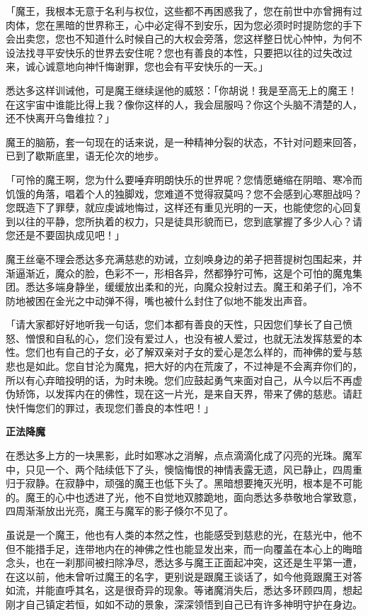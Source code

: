 \documentclass[twoside,openany]{book}
\newcommand{\mt}[1]{\textbullet \textbf{#1}}
\begin{document}
「魔王，我根本无意于名利与权位，这些都不再困惑我了，您在前世中亦曾拥有过肉体，您在黑暗的世界称王，心中必定得不到安乐，因为您必须时时提防您的手下会出卖您，您也不知道什么时候自己的大权会旁落，您这样整日忧心忡忡，为何不设法找寻平安快乐的世界去安住呢？您也有善良的本性，只要把以往的过失改过来，诚心诚意地向神忏悔谢罪，您也会有平安快乐的一天。」

悉达多这样训诫他，可是魔王继续逞他的威怒：「你胡说！我是至高无上的魔王！在这宇宙中谁能比得上我？像你这样的人，我会屈服吗？你这个头脑不清楚的人，还不快离开乌鲁维拉？」

魔王的脑筋，套一句现在的话来说，是一种精神分裂的状态，不针对问题来回答，已到了歇斯底里，语无伦次的地步。

「可怜的魔王啊，您为什么要唾弃明朗快乐的世界呢？您情愿蜷缩在阴暗、寒冷而饥饿的角落，唱着个人的独脚戏，您难道不觉得寂莫吗？您不会感到心寒胆战吗？您既造下了罪孽，就应虔诚地悔过，这样还有重见光明的一天，也能使您的心回复到以往的平静，您所执着的权力，只是徒具形貌而已，您到底掌握了多少人心？请您还是不要固执成见吧！」

魔王丝毫不理会悉达多充满慈悲的劝诫，立刻唤身边的弟子把菩提树包围起来，并渐逼渐近，魔众的脸，色彩不一，形相各异，然都狰狞可怖，这是个可怕的魔鬼集团。悉达多端身静坐，缓缓放出柔和的光，向魔众投射过去。魔王和弟子们，冷不防地被困在金光之中动弹不得，嘴也被什么封住了似地不能发出声音。

「请大家都好好地听我一句话，您们本都有善良的天性，只因您们孳长了自己愤怒、憎恨和自私的心，您们没有爱过人，也没有被人爱过，也就无法发挥慈爱的本性。您们也有自己的子女，必了解双亲对子女的爱心是怎么样的，而神佛的爱与慈悲也是如此。您自甘沦为魔鬼，把大好的内在荒废了，不过神是不会离弃你们的，所以有心弃暗投明的话，为时未晚。您们应鼓起勇气来面对自己，从今以后不再虚伪矫饰，以发挥内在的佛性，现在这一片光，是来自天界，带来了佛的慈悲。请赶快忏悔您们的罪过，表现您们善良的本性吧！」

\mt{正法降魔}

在悉达多上方的一块黑影，此时如寒冰之消解，点点滴滴化成了闪亮的光珠。魔军中，只见一个、两个陆续低下了头，懊恼悔恨的神情表露无遗，风已静止，四周重归于寂静。在寂静中，顽强的魔王也低下头了。黑暗想要掩灭光明，根本是不可能的。魔王的心中也透进了光，他不自觉地双膝跪地，面向悉达多恭敬地合掌致意，四周渐渐放出光亮，魔王与魔军的影子倏尔不见了。

虽说是一个魔王，他也有人类的本然之性，也能感受到慈悲的光，在慈光中，他不但不能措手足，连带地内在的神佛之性也能显发出来，而一向覆盖在本心上的晦暗念头，也在一刹那间被扫除净尽，悉达多与魔王正面起冲突，这还是生平第一遭，在这以前，他未曾听过魔王的名字，更别说是跟魔王谈话了，如今他竟跟魔王对答如流，并能直呼其名，这是很奇异的现象。等诸魔消失后，悉达多环顾四周，想起刚才自己镇定若恒，如如不动的景象，深深领悟到自己已有许多神明守护在身边。
\end{document}

